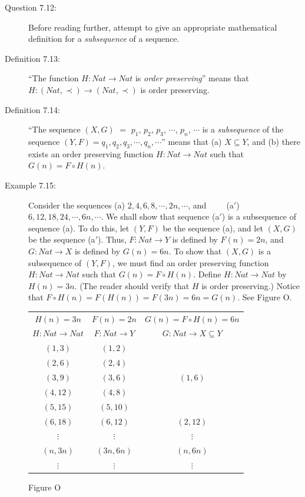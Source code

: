 \documentclass{book}
\begin{document}
\begin{description}

\item[Question 7.12:] Before reading further, attempt to give an appropriate mathematical definition for a \emph{subsequence} of a sequence.

\item[Definition 7.13:] ``The function $H: Nat \rightarrow Nat$ is \emph{order preserving}'' means that $H: (Nat, \prec) \rightarrow (Nat, \prec)$ is order preserving.

\item[Definition 7.14:] ``The sequence $(X, G)$ $=$ $p_{1}$, $p_{2}$, $p_{3}$, $\cdots$, $p_{n}$, $\cdots$ is a \emph{subsequence} of the sequence $(Y, F) = q_{1}, q_{2}, q_{3}, \cdots, q_{n}, \cdots$'' means that (a) $X \subseteq Y$, and (b) there exists an order preserving function $H: Nat \rightarrow Nat$ such that $G(n) = F \circ H(n)$.

\item[Example 7.15:] Consider the sequences (a) $2, 4, 6, 8, \cdots, 2n, \cdots$, and $\ \ \ \ \ \ \ \ $ (a$'$) $6, 12, 18, 24, \cdots, 6n, \cdots$. We shall show that sequence (a$'$) is a subsequence of sequence (a). To do this, let $(Y, F)$ be the sequence (a), and let $(X,G)$ be the sequence (a$'$). Thus, $F: Nat \rightarrow Y$ is defined by $F(n) = 2n$, and $G: Nat \rightarrow X$ is defined by $G(n) = 6n$. To show that $(X,G)$ is a subsequence of $(Y,F)$, we must find an order preserving function $H: Nat \rightarrow Nat$ such that $G(n) = F \circ H(n)$. Define $H: Nat \rightarrow Nat$ by $H(n) = 3n$. (The reader should verify that $H$ is order preserving.) Notice that $F \circ H(n) = F(H(n)) = F(3n) = 6n = G(n)$. See Figure O.

\begin{center}
\begin{tabular}{ccc}
  $H(n) = 3n$              & $F(n) = 2n$           & $G(n) = F \circ H(n) = 6n$ \\
  $H: Nat \rightarrow Nat$ & $F: Nat \rightarrow Y$ & $G: Nat \rightarrow X \subseteq Y$ \\
  $(1,3)$  & $(1,2)$   &          \\
  $(2,6)$  & $(2,4)$   &          \\
  $(3,9)$  & $(3,6)$   & $(1,6)$  \\
  $(4,12)$ & $(4,8)$   &          \\
  $(5,15)$ & $(5,10)$  &          \\
  $(6,18)$ & $(6,12)$  & $(2,12)$ \\
  $\vdots$ & $\vdots$  & $\vdots$ \\
  $(n,3n)$ & $(3n,6n)$ & $(n,6n)$ \\
  $\vdots$ & $\vdots$  & $\vdots$ \\
\end{tabular}
\end{center}
\begin{center}
Figure O
\end{center}


\end{description}
\end{document}
